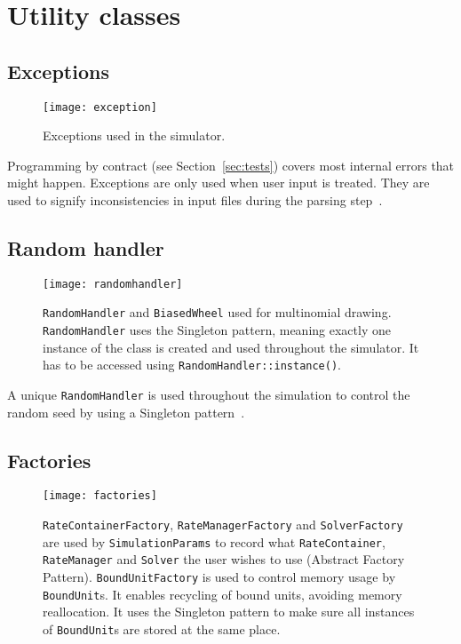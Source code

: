 
\section{Utility classes}

\subsection{Exceptions}

\begin{figure}[!h]
  \centering
  \texttt{[image: exception]}
  \caption{Exceptions used in the simulator.}
\label{fig:exception}
\end{figure}

Programming by contract (see Section~\ref{sec:tests}) covers most internal errors that might happen.
Exceptions are only used when user input is treated.
They are used to signify inconsistencies in input files during the parsing step~.

\subsection{Random handler}

\begin{figure}[!h]
  \centering
  \texttt{[image: randomhandler]}
  \caption{
  \texttt{RandomHandler} and \texttt{BiasedWheel} used for multinomial drawing.
  \texttt{RandomHandler} uses the Singleton pattern,
  meaning exactly one instance of the class is created and used throughout the simulator.
  It has to be accessed using \texttt{RandomHandler::instance()}.
  }
\label{fig:random_handler}
\end{figure}

A unique \texttt{RandomHandler} is used throughout the simulation to control
the random seed by using a Singleton pattern~.

\subsection{Factories}

\begin{figure}[!h]
  \centering
  \texttt{[image: factories]}
  \caption{
  \texttt{RateContainerFactory}, \texttt{RateManagerFactory} and \texttt{SolverFactory}
  are used by \texttt{SimulationParams} to record what \texttt{RateContainer},
  \texttt{RateManager} and \texttt{Solver} the user wishes to use (Abstract Factory Pattern).
  \texttt{BoundUnitFactory} is used to control memory usage by \texttt{BoundUnit}s.
  It enables recycling of bound units, avoiding memory reallocation.
  It uses the Singleton pattern to make sure all instances of \texttt{BoundUnit}s are stored at the same place.}
\label{fig:factories}
\end{figure}

